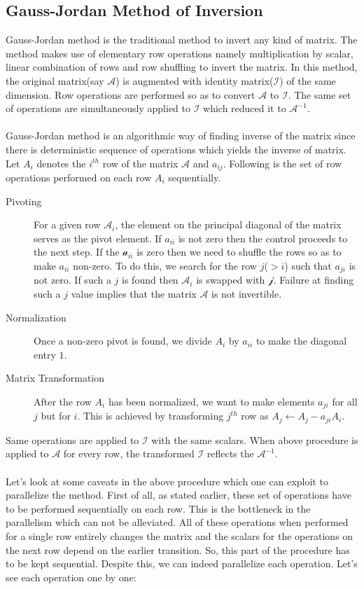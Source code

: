 \documentclass[11pt]{article}
\begin{document}
\subsection{Gauss-Jordan Method of Inversion}
Gauss-Jordan method is the traditional method to invert any kind of matrix. The method makes use of elementary row operations namely multiplication by scalar, linear combination of rows and row shuffling to invert the matrix. In this method, the original matrix(say $\mathcal{A}$) is augmented with identity matrix($\mathcal{I}$) of the same dimension. Row operations are performed so as to convert $\mathcal{A}$ to $\mathcal{I}$. The same set of operations are simultaneously applied to $\mathcal{I}$ which reduced it to $\mathcal{A}^{-1}$. \\\\
Gauss-Jordan method is an algorithmic way of finding inverse of the matrix since there is deterministic sequence of operations which yields the inverse of matrix. Let $A_i$ denotes the $i^{th}$ row of the matrix $\mathcal{A}$ and $a_{ij}$. Following is the set of row operations performed on each row $A_i$ sequentially.
\begin{description}
	\item[Pivoting] For a given row $\mathcal{A}_i$, the element on the principal diagonal of the matrix serves as the pivot element. If $a_{ii}$ is not zero then the control proceeds to the next step. If the $\mathcal{a}_{ii}$ is zero then we need to shuffle the rows so as to make $a_{ii}$ non-zero. To do this, we search for the row $j$($> i$) such that $a_{ji}$ is not zero. If such a $j$ is found then $\mathcal{A}_{i}$ is swapped with $\mathcal{j}$. Failure at finding such a $j$ value implies that the matrix $\mathcal{A}$ is not invertible.
	\item[Normalization] Once a non-zero pivot is found, we divide $A_i$ by $a_{ii}$ to make the diagonal entry $1$.
	\item[Matrix Transformation] After the row $A_i$ has been normalized, we want to make elements $a_{ji}$ for all $j$ but for $i$. This is achieved by transforming $j^{th}$ row as $A_j \leftarrow A_j - a_{ji}A_i$.
\end{description}
Same operations are applied to $\mathcal{I}$ with the same scalars. When above procedure is applied to $\mathcal{A}$ for every row, the transformed $\mathcal{I}$ reflects the $\mathcal{A}^{-1}$.\\\\
Let's look at some caveats in the above procedure which one can exploit to parallelize the method. First of all, as stated earlier, these set of operations have to be performed sequentially on each row. This is the bottleneck in the parallelism which can not be alleviated. All of these operations when performed for a single row entirely changes the matrix and the scalars for the operations on the next row depend on the earlier transition. So, this part of the procedure has to be kept sequential. Despite this, we can indeed parallelize each operation. Let's see each operation one by one:
\end{document}
